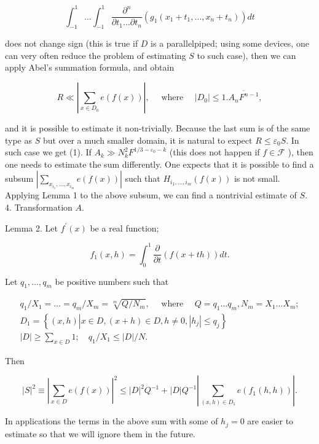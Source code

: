 \documentclass[10pt]{article}
\begin{document}
$$
\int_{-1}^{1} \ldots \int_{-1}^{1} \frac{\partial^{n}}{\partial t_{1} \ldots \partial t_{n}}\left(g_{1}\left(x_{1}+t_{1}, \ldots, x_{n}+t_{n}\right)\right) d t
$$

does not change sign (this is true if $D$ is a parallelpiped; using some devices, one can very often reduce the problem of estimating $S$ to such case), then we can apply Abel's summation formula, and obtain

$$
R \ll\left|\sum_{x \in D_{0}} e(f(x))\right|, \quad \text { where } \quad\left|D_{0}\right| \leqslant 1 . \overline{A_{n} F^{n-1}},
$$

and it is possible to estimate it non-trivially. Because the last sum is of the same type as $S$ but over a much smaller domain, it is natural to expect $R \leqslant \varepsilon_{0} S$. In such case we get (1). If $A_{k} \gg N_{k}^{2} F^{1 / 3-\varepsilon_{0}-k}$ (this does not happen if $f \in \mathscr{F}$ ), then one needs to estimate the sum differently. One expects that it is possible to find a subsum $\left|\sum_{x_{i_{1}}, \ldots, x_{i_{m}}} e(f(x))\right|$ such that $H_{i_{1}, \ldots, i_{m}}(f(x))$ is not small. Applying Lemma 1 to the above subsum, we can find a nontrivial estimate of $S$.\\
4. Transformation $A$.

Lemma 2. Let $f^{\prime}(x)$ be a real function;

$$
f_{1}(x, h)=\int_{0}^{1} \frac{\partial}{\partial t}(f(x+t h)) d t .
$$

Let $q_{1}, \ldots, q_{m}$ be positive numbers such that

$$
\begin{gathered}
q_{1} / X_{1}=\ldots=q_{m} / X_{m}=\sqrt[m]{Q / N_{m}}, \quad \text { where } \quad Q=q_{1} \ldots q_{m}, N_{m}=X_{1} \ldots X_{m} ; \\
D_{1}=\left\{(x, h)\left|x \in D,(x+h) \in D, h \neq 0,\left|h_{j}\right| \leqslant q_{j}\right\}\right. \\
|D| \geqslant \sum_{x \in D} 1 ; \quad q_{1} / X_{1} \leqslant|D| / N .
\end{gathered}
$$

Then

$$
|S|^{2} \equiv\left|\sum_{x \in D} e(f(x))\right|^{2} \leqslant|D|^{2} Q^{-1}+|D| Q^{-1}\left|\sum_{(x, h) \in D_{1}} e\left(f_{1}(h, h)\right)\right| .
$$

In applications the terms in the above sum with some of $h_{j}=0$ are easier to estimate so that we will ignore them in the future.
\end{document}
